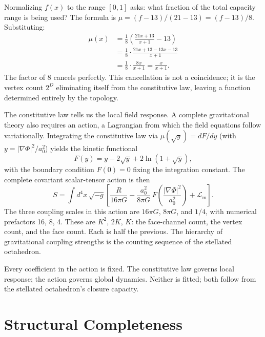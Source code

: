 \documentclass[twocolumn]{iopjournal}
\begin{document}
Normalizing $f(x)$ to the range $[0, 1]$ asks: what fraction of the total capacity range is being used? The formula is $\mu = (f - 13)/(21 - 13) = (f - 13)/8$. Substituting:
\begin{align}
\mu(x) &= \frac{1}{8}\left(\frac{21x + 13}{x + 1} - 13\right) \nonumber \\[4pt]
&= \frac{1}{8} \cdot \frac{21x + 13 - 13x - 13}{x + 1} \nonumber \\[4pt]
&= \frac{1}{8} \cdot \frac{8x}{x + 1} = \frac{x}{x + 1}.
\label{eq:mu}
\end{align}
The factor of 8 cancels perfectly. This cancellation is not a coincidence; it is the vertex count $2^D$ eliminating itself from the constitutive law, leaving a function determined entirely by the topology.

The constitutive law tells us the local field response. A complete gravitational theory also requires an action, a Lagrangian from which the field equations follow variationally. Integrating the constitutive law via $\mu(\sqrt{y}) = dF/dy$ (with $y = |\nabla\Phi|^2/a_0^2$) yields the kinetic functional
\begin{equation}
F(y) = y - 2\sqrt{y} + 2\ln\!\left(1 + \sqrt{y}\right),
\end{equation}
with the boundary condition $F(0) = 0$ fixing the integration constant. The complete covariant scalar-tensor action is then
\begin{equation}
S = \int d^4x\,\sqrt{-g}\left[\frac{R}{16\pi G} - \frac{a_0^2}{8\pi G}\,F\!\left(\frac{|\nabla\Phi|^2}{a_0^2}\right) + \mathcal{L}_\text{m}\right].
\label{eq:action}
\end{equation}
The three coupling scales in this action are $16\pi G$, $8\pi G$, and $1/4$, with numerical prefactors 16, 8, 4. These are $K^2$, $2K$, $K$: the face-channel count, the vertex count, and the face count. Each is half the previous. The hierarchy of gravitational coupling strengths is the counting sequence of the stellated octahedron.

Every coefficient in the action is fixed. The constitutive law governs local response; the action governs global dynamics. Neither is fitted; both follow from the stellated octahedron's closure capacity.


\section{Structural Completeness}
\label{sec:completeness}
\end{document}
